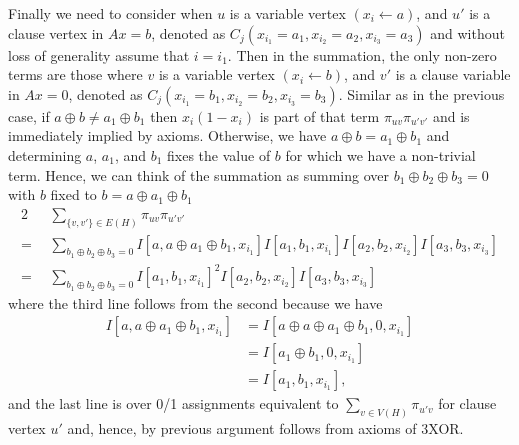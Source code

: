 \documentclass[a4paper,twoside,justified]{tufte-handout}
\begin{document}
\begin{description}
    Finally we need to consider when $u$ is a variable vertex $(x_i \leftarrow a)$,
    and $u'$ is a clause vertex in $Ax=b$, denoted as $C_j(x_{i_1}=a_1,x_{i_2}=a_2,x_{i_3}=a_3)$
    and without loss of generality assume that $i=i_1$.
    Then in the summation, the only non-zero terms are those where $v$ is a variable vertex $(x_i \leftarrow b)$,
    and $v'$ is a clause variable in $Ax=0$, denoted as $C_j(x_{i_1}=b_1,x_{i_2}=b_2,x_{i_3}=b_3)$.
    Similar as in the previous case, if $a \oplus b \neq a_1 \oplus b_1$ then $x_i (1 - x_i)$ is
    part of that term $\pi_{u v} \pi_{u' v'}$ and is immediately implied by axioms.
    Otherwise, we have $a \oplus b=a_1 \oplus b_1$ and determining $a$, $a_1$, and $b_1$
    fixes the value of $b$ for which we have a non-trivial term. Hence, we can think of the 
    summation as summing over $b_1 \oplus b_2 \oplus b_3 = 0$ with $b$ fixed to 
    $b = a \oplus a_1 \oplus b_1$
    \begin{alignat*}{2}
      &~ \sum_{\{v,v'\} \in E(H)} \pi_{uv} \pi_{u'v'} \\
      = ~&~ \sum_{b_1 \oplus b_2 \oplus b_3 = 0} I[a,a \oplus a_1 \oplus b_1,x_{i_1}] I[a_1,b_1,x_{i_1}] I[a_2,b_2,x_{i_2}] I[a_3,b_3,x_{i_3}] \\
      = ~&~ \sum_{b_1 \oplus b_2 \oplus b_3 = 0} I[a_1,b_1,x_{i_1}]^2 I[a_2,b_2,x_{i_2}] I[a_3,b_3,x_{i_3}] 
    \end{alignat*}
    where the third line follows from the second because we have 
    \begin{align*}
      I[a,a \oplus a_1 \oplus b_1,x_{i_1}] &= I[a \oplus a \oplus a_1 \oplus b_1, 0, x_{i_1}] \\
      &= I[a_1 \oplus b_1, 0,x_{i_1}] \\
      &= I[a_1,b_1,x_{i_1}],
    \end{align*}
    and the last line is over 0/1 assignments equivalent to $\sum_{v \in V(H)} \pi_{u' v}$ for
    clause vertex $u'$ and, hence, by previous argument follows from axioms of 3XOR.
\end{description}



\end{document}
